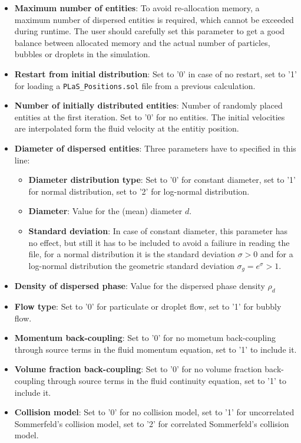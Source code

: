 \documentclass[12pt]{article}
\begin{document}
\begin{itemize}
\item {\bf Maximum number of entities}: To avoid re-allocation memory, a maximum number of dispersed entities is required, which cannot be exceeded during runtime. The user should carefully set this parameter to get a good balance between allocated memory and the actual number of particles, bubbles or droplets in the simulation.
\item {\bf Restart from initial distribution}: Set to '0' in case of no restart, set to '1' for loading a {\tt{PLaS\_Positions.sol}} file from a previous calculation.
\item {\bf Number of initially distributed entities}: Number of randomly placed entities at the first iteration. Set to '0' for no entities. The initial velocities are interpolated form the fluid velocity at the entitiy position.
\item {\bf Diameter of dispersed entities}: Three parameters have to specified in this line:
\begin{itemize}
\item {\bf Diameter distribution type}: Set to '0' for constant diameter, set to '1' for normal distribution, set to '2' for log-normal distribution.
\item {\bf Diameter}: Value for the (mean) diameter $d$.
\item {\bf Standard deviation}: In case of constant diameter, this parameter has no effect, but still it has to be included to avoid a failiure in reading the file, for a normal distribution it is the standard deviation $\sigma>0$ and for a log-normal distribution the geometric standard deviation $\sigma_g=e^\sigma>1$.
\end{itemize}
\item {\bf Density of dispersed phase}: Value for the dispersed phase density $\rho_d$
\item {\bf Flow type}: Set to '0' for particulate or droplet flow, set to '1' for bubbly flow.
\item {\bf Momentum back-coupling}: Set to '0' for no mometum back-coupling through source terms in the fluid momentum equation, set to '1' to include it.
\item {\bf Volume fraction back-coupling}: Set to '0' for no volume fraction back-coupling  through source terms in the fluid continuity equation, set to '1' to include it.
\item {\bf Collision model}: Set to '0' for no collision model, set to '1' for uncorrelated Sommerfeld's collision model, set to '2' for correlated Sommerfeld's collision model.

\end{itemize}
\end{document}
